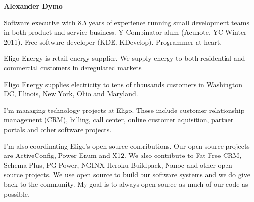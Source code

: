 \documentclass[12pt]{letter}
\begin{document}
{\large\centering\textbf{Alexander Dymo}\\}

\address
{
  \texttt{alex@alexdymo.com} \\
  \url{http://www.alexdymo.com}\\
  \url{http://www.linkedin.com/in/adymo}\\
  +1\,312\,709\,3026 \\
  Chicago, USA \\
}


\begin{llist}

  \vspace{.30in}                %


             Software executive with 8.5 years of experience running small development teams in both product and service business.
             Y Combinator alum (Acunote, YC Winter 2011). Free software developer (KDE, KDevelop). Programmer at heart.



  \startexperience

           \item Eligo Energy is retail energy supplier. We supply energy to both residential and commercial customers in deregulated markets.

           \item Eligo Energy supplies electricity to tens of thousands customers in Washington DC, Illinois, New York, Ohio and Maryland.

           \item I'm managing technology projects at Eligo. These include customer relationship management (CRM), billing, call center, online customer aquisition, partner portals and other software projects.

           \item I'm also coordinating Eligo's open source contributions. Our open source projects are ActiveConfig, Power Enum and X12. We also contribute to Fat Free CRM, Schema Plus, PG Power, NGINX Heroku Buildpack, Nanoc and other open source projects. We use open source to build our software systems and we do give back to the community. My goal is to always open source as much of our code as possible.


\end{llist}
\end{document}
